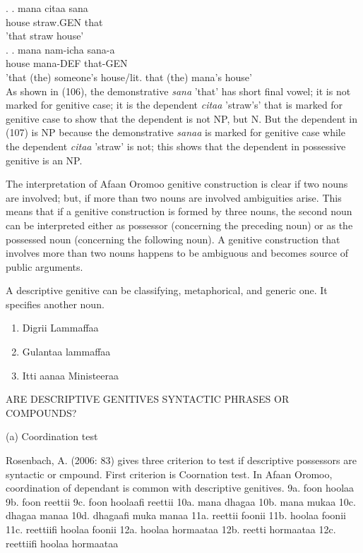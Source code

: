 \documentclass[11pt,a4paper]{article}
\begin{document}
	\ex.
	\ag.
	mana citaa sana \\
	house straw.GEN that\\
	'that  straw house'\\
	
	\ex.
	\ag.
	mana nam-icha sana-a\\
	house mana-DEF that-GEN\\
	'that (the) someone's house/lit. that (the) mana's house'\\
	
	As shown in (106), the demonstrative \emph{sana} 'that' has short final vowel; it is not marked for genitive case; it is the dependent \emph{citaa} 'straw's' that is marked for genitive case to show that the dependent is not NP, but N. But the dependent in (107) is NP because the demonstrative \emph{sanaa} is marked for genitive case while the dependent \emph{citaa} 'straw' is not; this shows that the dependent in possessive genitive is an NP. 
	
		
	The interpretation of Afaan Oromoo genitive construction is clear if two nouns are involved; but, if more than two nouns are involved ambiguities arise. This means that if a genitive construction is 
	formed by three nouns, the second noun can be interpreted either as possessor (concerning the preceding noun) or as the possessed noun (concerning the
	following noun). A genitive construction that involves more than two nouns happens to be ambiguous and becomes source of public arguments.
	
	A descriptive genitive can be classifying, metaphorical, and generic one. It specifies another noun. 
	\begin{enumerate}
		\item Digrii Lammaffaa
		\item Gulantaa lammaffaa
		\item Itti aanaa Ministeeraa
	\end{enumerate}
	
	
	ARE DESCRIPTIVE GENITIVES SYNTACTIC PHRASES OR COMPOUNDS?
	
	(a) Coordination test
	
	Rosenbach, A. (2006: 83) gives three criterion to test if descriptive possessors are syntactic or cmpound. 
	First criterion is Coornation test. In Afaan Oromoo, coordination of dependant is common with descriptive genitives. 
	9a. foon hoolaa
	9b. foon reettii
	9c. foon hoolaafi reettii
	10a. mana dhagaa
	10b. mana mukaa
	10c. dhagaa manaa
	10d. dhagaafi muka manaa
	11a. reettii foonii
	11b. hoolaa foonii
	11c. reettiifi hoolaa foonii
	12a. hoolaa hormaataa
	12b. reetti hormaataa
	12c. reettiifi hoolaa hormaataa
	
\end{document}
